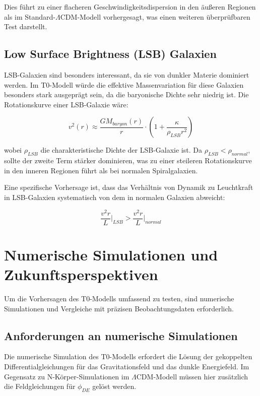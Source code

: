 \documentclass[a4paper,12pt]{article}
\begin{document}
	Dies führt zu einer flacheren Geschwindigkeitsdispersion in den äußeren Regionen als im Standard-$\Lambda$CDM-Modell vorhergesagt, was einen weiteren überprüfbaren Test darstellt.
	
	\subsection{Low Surface Brightness (LSB) Galaxien}
	
	LSB-Galaxien sind besonders interessant, da sie von dunkler Materie dominiert werden. Im T0-Modell würde die effektive Massenvariation für diese Galaxien besonders stark ausgeprägt sein, da die baryonische Dichte sehr niedrig ist. Die Rotationskurve einer LSB-Galaxie wäre:
	
	\begin{equation}
		v^2(r) \approx \frac{G M_{baryon}(r)}{r} \cdot \left(1 + \frac{\kappa}{\rho_{LSB} r^2}\right)
	\end{equation}
	
	wobei $\rho_{LSB}$ die charakteristische Dichte der LSB-Galaxie ist. Da $\rho_{LSB} < \rho_{normal}$, sollte der zweite Term stärker dominieren, was zu einer steileren Rotationskurve in den inneren Regionen führt als bei normalen Spiralgalaxien.
	
	Eine spezifische Vorhersage ist, dass das Verhältnis von Dynamik zu Leuchtkraft in LSB-Galaxien systematisch von dem in normalen Galaxien abweicht:
	
	\begin{equation}
		\frac{v^2r}{L} \bigg|_{LSB} > \frac{v^2r}{L} \bigg|_{normal}
	\end{equation}
	
	\section{Numerische Simulationen und Zukunftsperspektiven}
	
	Um die Vorhersagen des T0-Modells umfassend zu testen, sind numerische Simulationen und Vergleiche mit präzisen Beobachtungsdaten erforderlich.
	
	\subsection{Anforderungen an numerische Simulationen}
	
	Die numerische Simulation des T0-Modells erfordert die Lösung der gekoppelten Differentialgleichungen für das Gravitationsfeld und das dunkle Energiefeld. Im Gegensatz zu N-Körper-Simulationen im $\Lambda$CDM-Modell müssen hier zusätzlich die Feldgleichungen für $\phi_{DE}$ gelöst werden.
	
\end{document}
